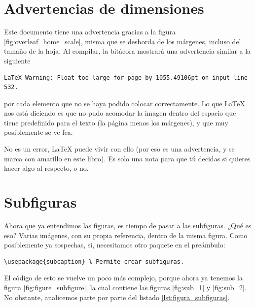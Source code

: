 \FloatBarrier %
\section{Advertencias de dimensiones}
\label{sec:advertencias_de_dimensiones}



Este documento tiene una advertencia gracias a la figura \ref{fig:overleaf_home_scale}, misma que se desborda de los márgenes, incluso del tamaño de la hoja. Al compilar, la bitácora mostrará una advertencia similar a la siguiente

\begin{lstlisting}[style=advertencias]
LaTeX Warning: Float too large for page by 1055.49106pt on input line 532.
\end{lstlisting}

\noindent por cada elemento que no se haya podido colocar correctamente. Lo que \LaTeX{} nos está diciendo es que no pudo acomodar la imagen dentro del espacio que tiene predefinido para el texto (la página menos los márgenes), y que muy posiblemente se ve fea.

No es un error, \LaTeX{} puede vivir con ello (por eso es una advertencia, y se marca con amarillo en este libro). Es solo una nota para que tú decidas si quieres hacer algo al respecto, o no.

\section{Subfiguras}
\label{sec:subfiguras}



Ahora que ya entendimos las figuras, es tiempo de pasar a las subfiguras. ¿Qué es eso? Varias imágenes, con su propia referencia, dentro de la misma figura. Como posiblemente ya sospechas, sí, necesitamos otro paquete en el preámbulo:

\begin{lstlisting}[style=latex,numbers=none]
\usepackage{subcaption} % Permite crear subfiguras.
\end{lstlisting}

El código de esto se vuelve un poco más complejo, porque ahora ya tenemos la figura \ref{fig:figure_subfigure}, la cual contiene las figuras \ref{fig:sub_1} y \ref{fig:sub_2}. No obstante, analicemos parte por parte del listado \ref{lst:figura_subfiguras}.

